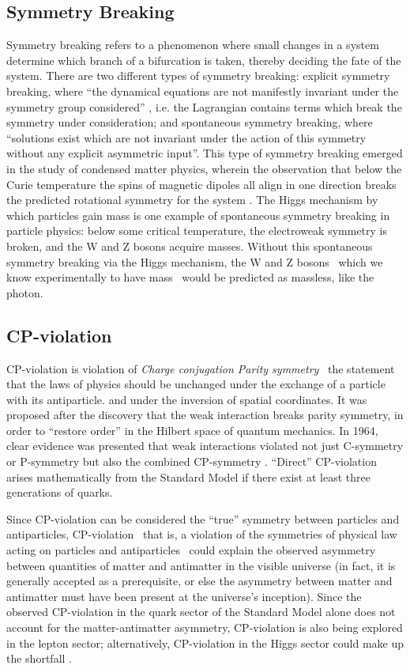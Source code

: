 \subsection{Symmetry Breaking}
Symmetry breaking refers to a phenomenon where small changes in a system determine which branch of a bifurcation is taken, thereby deciding the fate of the system. There are two different types of symmetry breaking: explicit symmetry breaking, where ``the dynamical equations are not manifestly invariant under the symmetry group considered'' \cite{Brading:2013:Symmetry}, i.e. the Lagrangian contains terms which break the symmetry under consideration; and spontaneous symmetry breaking, where ``solutions exist which are not invariant under the action of this symmetry without any explicit asymmetric input''. This type of symmetry breaking emerged in the study of condensed matter physics, wherein the observation that below the Curie temperature the spins of magnetic dipoles all align in one direction breaks the predicted rotational symmetry for the system \cite{Brading:2013:Symmetry}. The Higgs mechanism by which particles gain mass is one example of spontaneous symmetry breaking in particle physics: below some critical temperature, the electroweak symmetry is broken, and the W and Z bosons acquire masses. Without this spontaneous symmetry breaking via the Higgs mechanism, the W and Z bosons \textemdash \, which we know experimentally to have mass \textemdash \, would be predicted as massless, like the photon. \cite{Fermi:Electroweak}

\subsection{CP-violation}
CP-violation is violation of \emph{Charge conjugation Parity symmetry} \textemdash \, the statement that the laws of physics should be unchanged under the exchange of a particle with its antiparticle. and under the inversion of spatial coordinates. It was proposed after the discovery that the weak interaction breaks parity symmetry, in order to ``restore order'' in the Hilbert space of quantum mechanics. In 1964, clear evidence was presented that weak interactions violated not just C-symmetry or P-symmetry but also the combined CP-symmetry \cite{CroninFitch:CP}. ``Direct'' CP-violation arises mathematically from the Standard Model if there exist at least three generations of quarks.

Since CP-violation can be considered the ``true'' symmetry between particles and antiparticles, CP-violation \textemdash \, that is, a violation of the symmetries of physical law acting on particles and antiparticles \textemdash \, could explain the observed asymmetry between quantities of matter and antimatter in the visible universe (in fact, it is generally accepted as a prerequisite, or else the asymmetry between matter and antimatter must have been present at the universe's inception). Since the observed CP-violation in the quark sector of the Standard Model alone does not account for the matter-antimatter asymmetry, CP-violation is also being explored in the lepton sector; alternatively, CP-violation in the Higgs sector could make up the shortfall \cite{LHC:CP:Higgs}.

